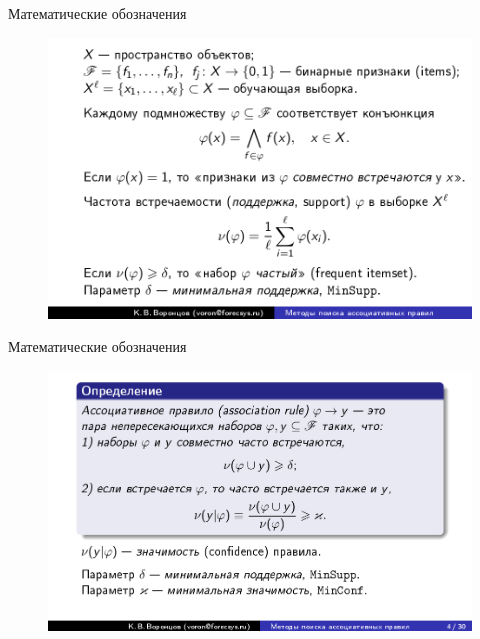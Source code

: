 \documentclass{beamer}
\begin{document}
\begin{frame}{Математические обозначения}
\begin{figure}[h]
\centering
\includegraphics[scale=0.4]{images/lec08-pic05.png}
\end{figure}
\end{frame}

\begin{frame}{Математические обозначения}
\begin{figure}[h]
\centering
\includegraphics[scale=0.4]{images/lec08-pic06.png}
\end{figure}
\end{frame}
\end{document}
